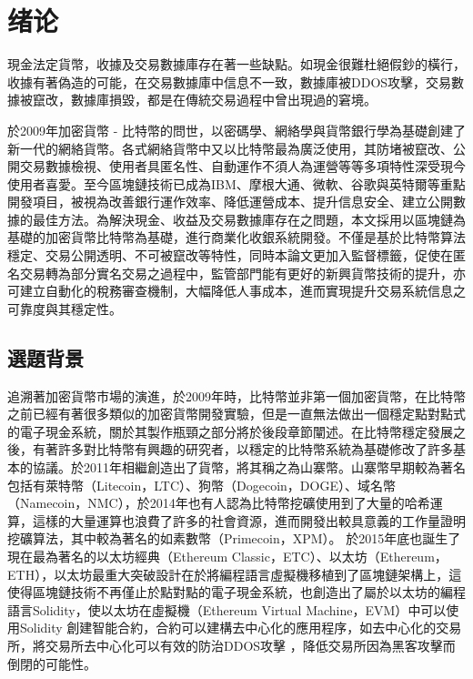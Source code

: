 
\chapter{绪论}

	現金法定貨幣，收據及交易數據庫存在著一些缺點。如現金很難杜絕假鈔的橫行，收據有著偽造的可能，在交易數據庫中信息不一致，數據庫被DDOS攻擊，交易數據被竄改，數據庫損毀，都是在傳統交易過程中曾出現過的窘境。

	於2009年加密貨幣 - 比特幣的問世，以密碼學、網絡學與貨幣銀行學為基礎創建了新一代的網絡貨幣。各式網絡貨幣中又以比特幣最為廣泛使用，其防堵被竄改、公開交易數據檢視、使⽤者具匿名性、⾃動運作不須⼈為運營等等多項特性深受現今使用者喜愛。至今區塊鏈技術已成為IBM、摩根大通、微軟、谷歌與英特爾等重點開發項目，被視為改善銀行運作效率、降低運營成本、提升信息安全、建立公開數據的最佳方法。為解決現金、收益及交易數據庫存在之問題，本文採用以區塊鏈為基礎的加密貨幣比特幣為基礎，進行商業化收銀系統開發。不僅是基於⽐特幣算法穩定、交易公開透明、不可被竄改等特性，同時本論⽂更加⼊監督標籤，促使在匿名交易轉為部分實名交易之過程中，監管部⾨能有更好的新興貨幣技術的提升，亦可建立自動化的稅務審查機制，大幅降低人事成本，進而實現提升交易系統信息之可靠度與其穩定性。

	\section{選題背景}

		追溯著加密貨幣市場的演進，於2009年時，比特幣並非第一個加密貨幣，在比特幣之前已經有著很多類似的加密貨幣開發實驗，但是一直無法做出一個穩定點對點式的電子現金系統，關於其製作瓶頸之部分將於後段章節闡述。在比特幣穩定發展之後，有著許多對比特幣有興趣的研究者，以穩定的比特幣系統為基礎修改了許多基本的協議。於2011年相繼創造出了貨幣，將其稱之為⼭寨幣。山寨幣早期較為著名包括有萊特幣（Litecoin，LTC）\supercite{litecoin}、狗幣（Dogecoin，DOGE）\supercite{dogecoin}、域名幣（Namecoin，NMC）\supercite{namecoin}，於2014年也有人認為比特幣挖礦使用到了大量的哈希運算，這樣的大量運算也浪費了許多的社會資源，進而開發出較具意義的工作量證明挖礦算法，其中較為著名的如素數幣（Primecoin，XPM）\supercite{primecoin}。 於2015年底也誕生了現在最為著名的以太坊經典（Ethereum Classic，ETC）\supercite{ethereumclassic}、以太坊（Ethereum，ETH）\supercite{ethereum}，以太坊最重⼤突破設計在於將編程語⾔虛擬機移植到了區塊鏈架構上，這使得區塊鏈技術不再僅止於點對點的電⼦現⾦系統，也創造出了屬於以太坊的編程語言Solidity\supercite{solidity}，使以太坊在虛擬機（Ethereum Virtual Machine，EVM）\supercite{Ethereum:Asecuredecentralisedgeneralisedtransactionledger}中可以使⽤Solidity 創建智能合約，合約可以建構去中心化的應用程序，如去中心化的交易所，將交易所去中心化可以有效的防治DDOS攻擊 \supercite{Bitcoin:Economicstechnologyandgovernance}，降低交易所因為黑客攻擊而倒閉的可能性。
		

